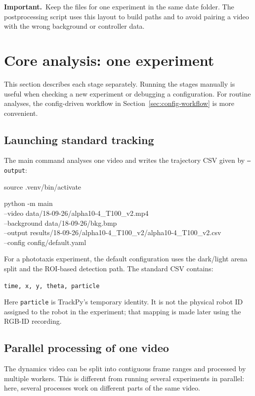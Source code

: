 \documentclass[11pt,a4paper]{article}
\newcommand{\important}[1]{%
  \begin{tcolorbox}[
    colback=PogoLight,
    colframe=PogoGreen,
    boxrule=0.7pt,
    arc=2mm,
    left=4mm,right=4mm,top=2.5mm,bottom=2.5mm
  ]
  \textcolor{PogoDark}{\textbf{Important.}}~#1
  \end{tcolorbox}%
}
\begin{document}
\important{Keep the files for one experiment in the same date folder. The postprocessing script uses this layout to build paths and to avoid pairing a video with the wrong background or controller data.}

\section{Core analysis: one experiment}

This section describes each stage separately. Running the stages manually is useful when checking a new experiment or debugging a configuration. For routine analyses, the config-driven workflow in Section~\ref{sec:config-workflow} is more convenient.

\subsection{Launching standard tracking}

The main command analyses one video and writes the trajectory CSV given by \texttt{--output}:

\begin{codeblock}
source .venv/bin/activate

python -m main \\
  --video data/18-09-26/alpha10-4_T100_v2.mp4 \\
  --background data/18-09-26/bkg.bmp \\
  --output results/18-09-26/alpha10-4_T100_v2/alpha10-4_T100_v2.csv \\
  --config config/default.yaml
\end{codeblock}

For a phototaxis experiment, the default configuration uses the dark/light arena split and the ROI-based detection path. The standard CSV contains:

\begin{center}
\texttt{time, x, y, theta, particle}
\end{center}

Here \texttt{particle} is TrackPy's temporary identity. It is not the physical robot ID assigned to the robot in the experiment; that mapping is made later using the RGB-ID recording.

\subsection{Parallel processing of one video}

The dynamics video can be split into contiguous frame ranges and processed by multiple workers. This is different from running several experiments in parallel: here, several processes work on different parts of the same video.
\end{document}
